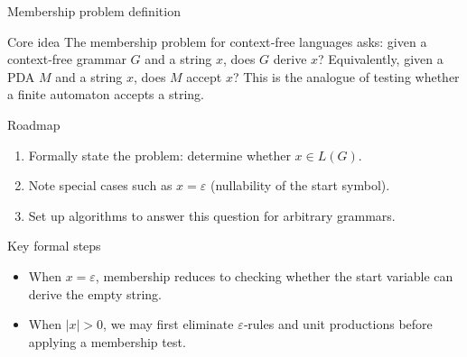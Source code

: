 \begin{frame}[t]{Membership problem definition}
  \begin{tblock}{Core idea}
    The membership problem for context‑free languages asks: given a
    context‑free grammar $G$ and a string $x$, does $G$ derive $x$?
    Equivalently, given a PDA $M$ and a string $x$, does $M$ accept $x$?
    This is the analogue of testing whether a finite automaton accepts a
    string.
  \end{tblock}
  \begin{tblock}{Roadmap}
    \begin{enumerate}
      \item Formally state the problem: determine whether $x \in L(G)$.
      \item Note special cases such as $x = \varepsilon$ (nullability of
        the start symbol).
      \item Set up algorithms to answer this question for arbitrary
        grammars.
    \end{enumerate}
  \end{tblock}
  \begin{tblock}{Key formal steps}
    \begin{itemize}
      \item When $x = \varepsilon$, membership reduces to checking
        whether the start variable can derive the empty string.
      \item When $|x| > 0$, we may first eliminate $\varepsilon$‑rules
        and unit productions before applying a membership test.
    \end{itemize}
  \end{tblock}
  \label{fr:6.3-02}
\end{frame}


